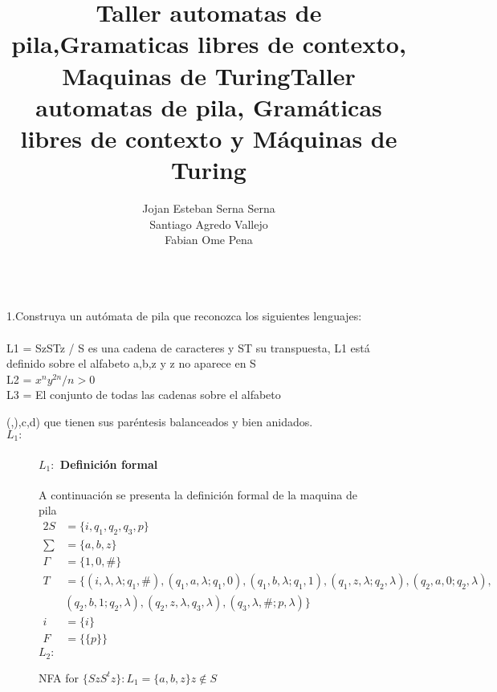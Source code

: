 \documentclass[10pt,a4paper]{book}
\date{}
\title{\Huge Taller automatas de pila,Gramaticas libres de contexto, Maquinas de Turing}
\author{Jojan Esteban Serna Serna\\Santiago Agredo Vallejo\\Fabian Ome Pena}
\begin{document}
	\maketitle
	\title{\huge Taller automatas de pila, Gramáticas libres de contexto y Máquinas de Turing}\\[2cm]
	1.Construya un autómata de pila que reconozca los siguientes lenguajes:\\ \\
	L1 = { SzSTz / S es una cadena de caracteres y ST su transpuesta},  L1 está definido sobre el alfabeto {a,b,z} y z no aparece en S\\
	L2 = ${ x^ny^{2n} / n>0}$\\
	L3 = El conjunto de todas las cadenas sobre el alfabeto {(,),c,d) que tienen sus paréntesis balanceados y bien anidados.\\
	\textbf{$L_1:$}
		\begin{figure*}[ht]
		\caption{NFA for $\{SzS^tz \} : L_1 = \{a,b,z\} z \notin S$}
\paragraph{$L_1:$ Definición formal}A continuación se presenta la definición formal de la maquina de pila\\[0.2cm]
\begin{alignat*}{2}
	S&= \{i, q_1, q_2, q_3, p\}\\
	\textstyle \sum&= \{a, b, z\}\\
	\Gamma&=\{1,0,\#\}\\
	T&=\{(i,\lambda,\lambda;q_1,\#),(q_1,a,\lambda;q_1,0),(q_1,b,\lambda;q_1,1),(q_1,z,\lambda;q_2,\lambda) ,(q_2,a,0;q_2,\lambda),\\&(q_2,b,1;q_2,\lambda),(q_2,z,\lambda,q_3,\lambda),(q_3,\lambda,\#;p,\lambda)    \}\\
	i&=\{i\}\\
	F&=\{\{p\}\}
\end{alignat*}
\newpage
\textbf{$L_2:$}
	\end{figure*}

}
\end{document}
